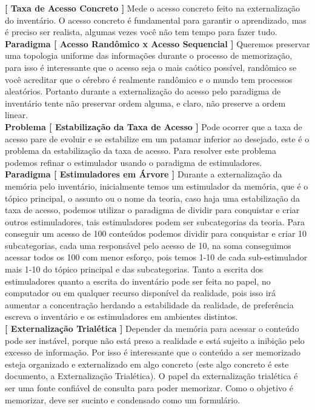 \textbf{[ Taxa de Acesso Concreto ]} Mede o acesso concreto feito na externalização do inventário. O acesso concreto é fundamental para garantir o aprendizado, mas é preciso ser realista, algumas vezes você não tem tempo para fazer tudo.\\

\textbf{Paradigma [ Acesso Randômico x Acesso Sequencial ]} Queremos preservar uma topologia uniforme das informações durante o processo de memorização, para isso é interessante que o acesso seja o mais caótico possível, randômico se você acreditar que o cérebro é realmente randômico e o mundo tem processos aleatórios. Portanto durante a externalização do acesso pelo paradigma de inventário tente não preservar ordem alguma, e claro, não preserve a ordem linear.\\

\textbf{Problema [ Estabilização da Taxa de Acesso ]} Pode ocorrer que a taxa de acesso pare de evoluir e se estabilize em um patamar inferior ao desejado, este é o problema da estabilização da taxa de acesso. Para resolver este problema podemos refinar o estimulador usando o paradigma de estimuladores.\\

\textbf{Paradigma [ Estimuladores em Árvore ]} Durante a externalização da memória pelo inventário, inicialmente temos um estimulador da memória, que é o tópico principal, o assunto ou o nome da teoria, caso haja uma estabilização da taxa de acesso, podemos utilizar o paradigma de dividir para conquistar e criar outros estimuladores, tais estimuladores podem ser subcategorias da teoria. Para conseguir um acesso de 100 conteúdos podemos dividir para conquistar e criar 10 subcategorias, cada uma responsável pelo acesso de 10, na soma conseguimos acessar todos os 100 com menor esforço, pois temos 1-10 de cada sub-estimulador mais 1-10 do tópico principal e das subcategorias. Tanto a escrita dos estimuladores quanto a escrita do inventário pode ser feita no papel, no computador ou em qualquer recurso disponível da realidade, pois isso irá aumentar a concentração herdando a estabilidade da realidade, de preferência escreva o inventário e os estimuladores em ambientes distintos.\\

\textbf{[ Externalização Trialética ]} Depender da memória para acessar o conteúdo pode ser instável, porque não está preso a realidade e está sujeito a inibição pelo excesso de informação. Por isso é interessante que o conteúdo a ser memorizado esteja organizado e externalizado em algo concreto (este algo concreto é este documento, a Externalização Trialética). O papel da externalização trialética é ser uma fonte confiável de consulta para poder memorizar. Como o objetivo é memorizar, deve ser sucinto e condensado como um formulário.\\

